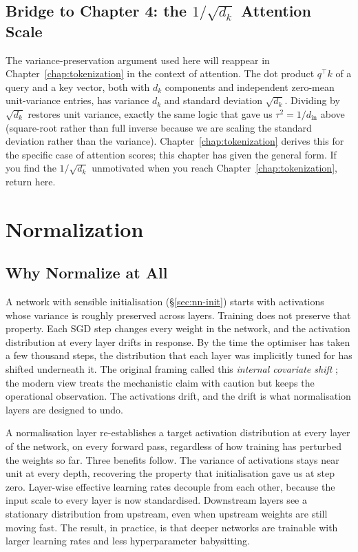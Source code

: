 \subsection{Bridge to Chapter 4: the $1/\sqrt{d_k}$ Attention Scale}

The variance-preservation argument used here will reappear in
Chapter~\ref{chap:tokenization} in the context of attention. The dot product $q^\top k$
of a query and a key vector, both with $d_k$ components and
independent zero-mean unit-variance entries, has variance $d_k$
and standard deviation $\sqrt{d_k}$. Dividing by $\sqrt{d_k}$
restores unit variance, exactly the same logic that gave us
$\tau^2 = 1/d_{\mathrm{in}}$ above (square-root rather than full
inverse because we are scaling the standard deviation rather
than the variance). Chapter~\ref{chap:tokenization} derives this for the specific case
of attention scores; this chapter has given the general form. If
you find the $1/\sqrt{d_k}$ unmotivated when you reach
Chapter~\ref{chap:tokenization}, return here.


\section{Normalization}
\label{sec:nn-norm}

\subsection{Why Normalize at All}

A network with sensible initialisation (\S\ref{sec:nn-init})
starts with activations whose variance is roughly preserved
across layers. Training does not preserve that property. Each SGD
step changes every weight in the network, and the activation
distribution at every layer drifts in response. By the time the
optimiser has taken a few thousand steps, the distribution that
each layer was implicitly tuned for has shifted underneath it.
The original framing called this \emph{internal covariate shift}
\citep{ioffe2015batchnorm}; the modern view treats the
mechanistic claim with caution but keeps the operational
observation. The activations drift, and the drift is what
normalisation layers are designed to undo.

A normalisation layer re-establishes a target activation
distribution at every layer of the network, on every forward
pass, regardless of how training has perturbed the weights so
far. Three benefits follow. The variance of activations stays
near unit at every depth, recovering the property that
initialisation gave us at step zero. Layer-wise effective
learning rates decouple from each other, because the input scale
to every layer is now standardised. Downstream layers see a
stationary distribution from upstream, even when upstream weights
are still moving fast. The result, in practice, is that deeper
networks are trainable with larger learning rates and less
hyperparameter babysitting.

